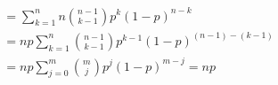 \documentclass[preview]{standalone}
\begin{document}
\begin{align*}
&= \sum ^{n} _{k=1} n {{n-1}\choose{k-1}} p^{k} (1-p)^{n-k}\\ &= n p \sum ^{n} _{k=1} {{n-1}\choose{k-1}} p^{k-1} (1-p)^{(n-1)-(k-1)}\\ &= n p \sum ^{m} _{j=0} {{m}\choose{j}} p^{j} (1-p)^{m-j} = n p
\end{align*}
\end{document}
